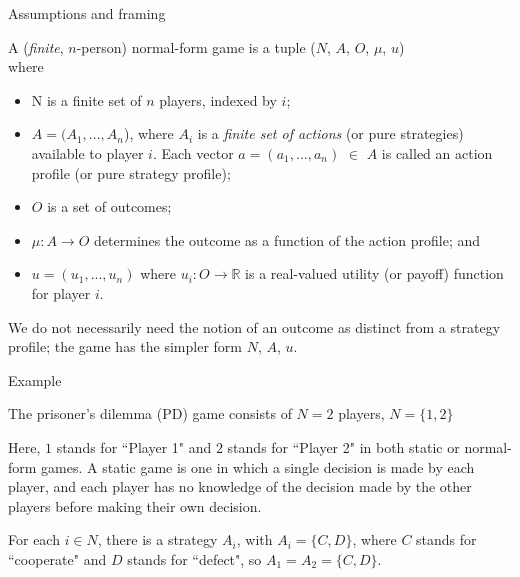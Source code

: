 \documentclass[10pt]{beamer} %
\theoremstyle{plain} %
\theoremstyle{definition} %
\begin{document}
\begin{frame}{\color{Maroon} Assumptions and framing}


\begin{tcolorbox}
    \begin{definition} 
    A (\textit{finite}, $n$-person) normal-form game is a tuple ($N$, $A$, $O$, $\mu$, $u$) \\
where
    \begin{itemize}
    \item N is a finite set of $n$ players, indexed by $i$;
    
    \item $A = (A_1, ..., A_n$), where $A_i$ is a \textit{finite set of actions} (or pure strategies) available to player $i$. Each vector $a = (a_1, ..., a_n)$ $\in$ $A$ is called an action profile (or pure strategy profile);
    
    \item $O$ is a set of outcomes;
    
    \item $\mu: A \rightarrow O$ determines the outcome as a function of the action profile; and
    \item $u = (u_1, ..., u_n)$ where $u_i: O \rightarrow \mathbb{R}$ is a real-valued utility (or payoff) function for player $i$.
    \end{itemize}
    
    \end{definition}
    \end{tcolorbox}

    We do not necessarily need the notion of an outcome as distinct from a strategy profile; the game has the simpler form $N$, $A$, $u$.
\end{frame}

\begin{frame}{\color{Maroon} Example}

The prisoner's dilemma (PD) game consists of $N =2 $ players, $N = \{1, 2\}$\\

\vspace{1cm}

Here, $1$ stands for ``Player 1" and $2$ stands for ``Player 2" in both static or normal-form games. A static game is one in which a single decision is made by each player, and each player has no knowledge of the decision made by the other players before making their own decision. \\

\vspace{1cm}

For each $i \in N$, there is a strategy $A_i$, with $A_i = \{C, D\}$, where $C$ stands for ``cooperate" and $D$ stands for ``defect", so $A_1 = A_2 = \{C, D\}$. \\


\end{frame}
\end{document}
